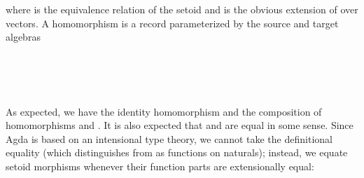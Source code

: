 \noindent where \AgdaUnderscore{}\AgdaUnderscore{} is the equivalence relation of the setoid
  and   is the obvious extension of  over vectors.
A homomorphism is a record parameterized by the source and target algebras

\begin{code}
\>[2]\AgdaSpace{}%
\AgdaSpace{}%
\AgdaSymbol{\{}\AgdaSymbol{\}}\AgdaSpace{}%
\AgdaSymbol{(}\AgdaSpace{}
\AgdaSpace{}\AgdaSymbol{:}\AgdaSpace{}\AgdaSpace{}\AgdaSymbol{)}\AgdaSpace{}%
\AgdaSymbol{:}\AgdaSpace{}%
\AgdaSpace{}%
\<%
\\
\>[2][@{}l@{\AgdaIndent{0}}]%
\>[4]\<%
\\
\>[4][@{}l@{\AgdaIndent{0}}]%
\>[6]%
\>[13]\AgdaSymbol{:}\AgdaSpace{}%
\<%
\\
%
\>[6]%
\>[12]\AgdaSymbol{:}\AgdaSpace{}%
\AgdaSpace{}%
\AgdaSpace{}\<%
\end{code}


\noindent As expected, we have the identity homomorphism
\AgdaSpace{}\AgdaSpace\AgdaSymbol{:}\AgdaSpace{}
\AgdaSpace{}\AgdaSpace{} and
the composition \AgdaSpace{}\AgdaSpace{}\AgdaSpace{}
\AgdaSymbol{:}\AgdaSpace{}
\AgdaSpace{}\AgdaSpace{} of homomorphisms
\AgdaSpace{}\AgdaSymbol{:}\AgdaSpace{}
\AgdaSpace{}\AgdaSpace{}
and
\AgdaSpace{}\AgdaSymbol{:}\AgdaSpace{}
\AgdaSpace{}\AgdaSpace{}.
It is also expected that
\AgdaSpace{}\AgdaSpace{}
\AgdaSpace{}\AgdaSpace and
  are
equal in some sense. Since Agda is based on an
intensional type theory, we cannot take the definitional equality
(which distinguishes  from     \AgdaFunction{+}  as functions
on naturals); instead, we equate setoid morphisms
whenever their function parts are extensionally equal:


